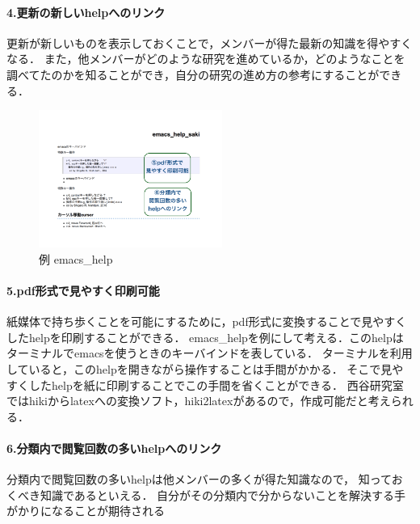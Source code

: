 \paragraph{4.更新の新しいhelpへのリンク}
\begin{description}
\item 更新が新しいものを表示しておくことで，メンバーが得た最新の知識を得やすくなる．
また，他メンバーがどのような研究を進めているか，どのようなことを調べてたのかを知ることができ，自分の研究の進め方の参考にすることができる．
\end{description}

\begin{figure}[htbp]\begin{center}
\includegraphics[width=6cm,bb=100 100 600 700]{my_help2hiki_saki.009.png}
\caption{例 emacs\_help}
\label{default}\end{center}\end{figure}

\paragraph{5.pdf形式で見やすく印刷可能}
\begin{description}
\item 紙媒体で持ち歩くことを可能にするために，pdf形式に変換することで見やすくしたhelpを印刷することができる．
emacs\_helpを例にして考える．このhelpはターミナルでemacsを使うときのキーバインドを表している．
ターミナルを利用していると，このhelpを開きながら操作することは手間がかかる．
そこで見やすくしたhelpを紙に印刷することでこの手間を省くことができる．
西谷研究室ではhikiからlatexへの変換ソフト，hiki2latexがあるので，作成可能だと考えられる．
\end{description}

\paragraph{6.分類内で閲覧回数の多いhelpへのリンク}
\begin{description}
\item 分類内で閲覧回数の多いhelpは他メンバーの多くが得た知識なので，
知っておくべき知識であるといえる．
自分がその分類内で分からないことを解決する手がかりになることが期待される
\end{description}

